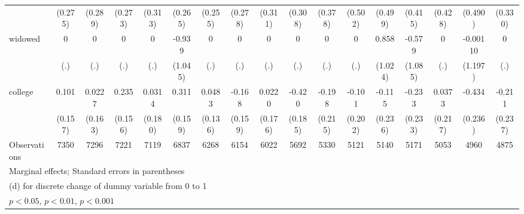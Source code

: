 {\begin{tabular}{l*{16}{c}}
                    &     (0.275)         &     (0.289)         &     (0.273)         &     (0.313)         &     (0.265)         &     (0.255)         &     (0.278)         &     (0.311)         &     (0.308)         &     (0.378)         &     (0.502)         &     (0.499)         &     (0.415)         &     (0.428)         &     (0.490)         &     (0.330)         \\
[1em]
widowed             &           0         &           0         &           0         &           0         &      -0.939         &           0         &           0         &           0         &           0         &           0         &           0         &       0.858         &      -0.579         &           0         &    -0.00110         &           0         \\
                    &         (.)         &         (.)         &         (.)         &         (.)         &     (1.045)         &         (.)         &         (.)         &         (.)         &         (.)         &         (.)         &         (.)         &     (1.024)         &     (1.085)         &         (.)         &     (1.197)         &         (.)         \\
[1em]
college             &       0.101         &      0.0227         &       0.235         &      0.0314         &       0.311\sym{*}  &      0.0483         &      -0.168         &      0.0220         &      -0.420\sym{*}  &      -0.198         &      -0.101         &      -0.115         &      -0.233         &      0.0373         &      -0.434         &      -0.211         \\
                    &     (0.157)         &     (0.163)         &     (0.156)         &     (0.180)         &     (0.159)         &     (0.136)         &     (0.159)         &     (0.176)         &     (0.185)         &     (0.215)         &     (0.202)         &     (0.236)         &     (0.233)         &     (0.217)         &     (0.236)         &     (0.237)         \\
\hline
Observations        &        7350         &        7296         &        7221         &        7119         &        6837         &        6268         &        6154         &        6022         &        5692         &        5330         &        5121         &        5140         &        5171         &        5053         &        4960         &        4875         \\
\hline\hline
\multicolumn{17}{l}{\footnotesize Marginal effects; Standard errors in parentheses}\\
\multicolumn{17}{l}{\footnotesize  (d) for discrete change of dummy variable from 0 to 1}\\
\multicolumn{17}{l}{\footnotesize \sym{*} \(p<0.05\), \sym{**} \(p<0.01\), \sym{***} \(p<0.001\)}\\
\end{tabular}
}
